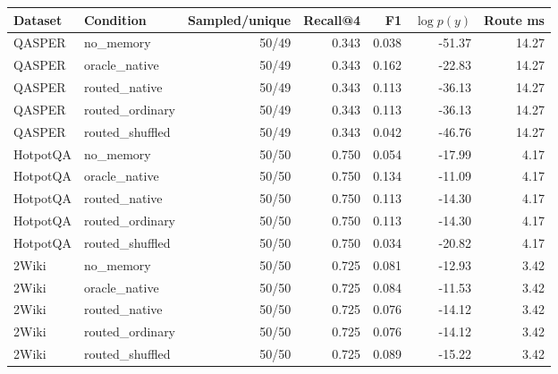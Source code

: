 \begin{tabular}{llrrrrr}
\toprule
Dataset & Condition & Sampled/unique & Recall@4 & F1 & $\log p(y)$ & Route ms \\
\midrule
QASPER & no\_memory & 50/49 & 0.343 & 0.038 & -51.37 & 14.27 \\
QASPER & oracle\_native & 50/49 & 0.343 & 0.162 & -22.83 & 14.27 \\
QASPER & routed\_native & 50/49 & 0.343 & 0.113 & -36.13 & 14.27 \\
QASPER & routed\_ordinary & 50/49 & 0.343 & 0.113 & -36.13 & 14.27 \\
QASPER & routed\_shuffled & 50/49 & 0.343 & 0.042 & -46.76 & 14.27 \\
HotpotQA & no\_memory & 50/50 & 0.750 & 0.054 & -17.99 & 4.17 \\
HotpotQA & oracle\_native & 50/50 & 0.750 & 0.134 & -11.09 & 4.17 \\
HotpotQA & routed\_native & 50/50 & 0.750 & 0.113 & -14.30 & 4.17 \\
HotpotQA & routed\_ordinary & 50/50 & 0.750 & 0.113 & -14.30 & 4.17 \\
HotpotQA & routed\_shuffled & 50/50 & 0.750 & 0.034 & -20.82 & 4.17 \\
2Wiki & no\_memory & 50/50 & 0.725 & 0.081 & -12.93 & 3.42 \\
2Wiki & oracle\_native & 50/50 & 0.725 & 0.084 & -11.53 & 3.42 \\
2Wiki & routed\_native & 50/50 & 0.725 & 0.076 & -14.12 & 3.42 \\
2Wiki & routed\_ordinary & 50/50 & 0.725 & 0.076 & -14.12 & 3.42 \\
2Wiki & routed\_shuffled & 50/50 & 0.725 & 0.089 & -15.22 & 3.42 \\
\bottomrule
\end{tabular}
